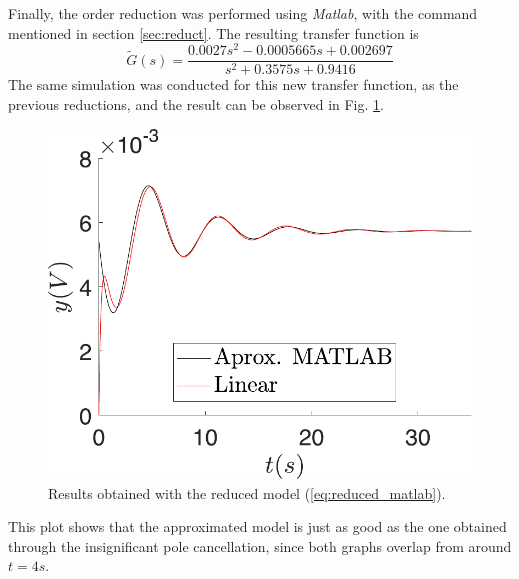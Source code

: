 Finally, the order reduction was performed using \textit{Matlab}, with the command mentioned in section \ref{sec:reduct}. The resulting transfer function is
\begin{equation}\label{eq:reduced_matlab}
    \tilde{G}(s)=\dfrac{0.0027 s^2 - 0.0005665 s + 0.002697}{s^2 + 0.3575 s + 0.9416}
\end{equation}
The same simulation was conducted for this new transfer function, as the previous reductions, and the result can be observed in Fig. \ref{fig:reduced_matlab}.
\begin{figure}[H]
    \centering
    \includegraphics[scale=0.5]{figs/reduc/Reduccion_matlab.pdf}
    \caption{Results obtained with the reduced model (\ref{eq:reduced_matlab}).}
    \label{fig:reduced_matlab}
\end{figure}
This plot shows that the approximated model is just as good as the one obtained through the insignificant pole cancellation, since both graphs overlap from around $t=4s$.


